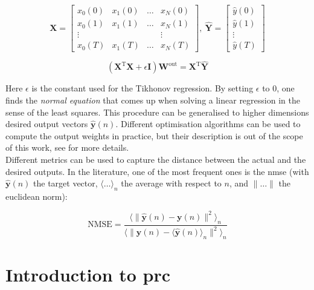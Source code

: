\begin{equation}
	\mathbf{X} = \begin{bmatrix}
			x_0(0) & x_1(0) & \dots & x_N(0)\\
			x_0(1) & x_1(1) & \dots & x_N(1)\\
			\vdots & & & \vdots \\
			x_0(T) & x_1(T) & \dots & x_N(T)			
	\end{bmatrix},~ \hat{\mathbf{Y}} = \begin{bmatrix}
		\hat{y}(0)\\
		\hat{y}(1)\\
		\vdots \\
		\hat{y}(T)
	\end{bmatrix}
\end{equation} 

\begin{equation}
	\left(\mathbf{X}^{\text{T}} \mathbf{X}+\epsilon \mathbf{I} \right) \mathbf{W}^{\text{out}} = \mathbf{X}^{\text{T}} \hat{\mathbf{Y}}
	\label{ridge-regression}
\end{equation}

Here $\epsilon$ is the constant used for the Tikhonov regression. By setting $\epsilon$ to 0, one finds the \textit{normal equation} that comes up when solving a linear regression \cite{Goudarzi2014ACS} in the sense of the least squares. This procedure can be generalised to higher dimensions desired output vectors $\hat{\mathbf{y}}(n)$. Different optimisation algorithms can be used to compute the output weights in practice, but their description is out of the scope of this work, see \cite{Lukoeviius2009} for more details.\\

Different metrics can be used to capture the distance between the actual and the desired outputs. In the literature, one of the most frequent ones is the \gls{nmse} \cite{Duport2016} (with $\hat{\mathbf{y}}(n)$ the target vector, $\langle \dots \rangle _n$ the average with respect to $n$, and $\| \dots \|$ the euclidean norm):

\begin{equation}
	\text{NMSE} = \frac{\langle \| \hat{\mathbf{y}}(n) - \mathbf{y}(n)\|^2 \rangle _n}{\langle \| \hat{\mathbf{y}}(n) - \langle \hat{\mathbf{y}}(n) \rangle _n \|^2 \rangle _n}
\end{equation}


\section{Introduction to \acrlong{prc}}


